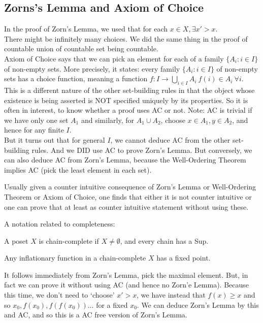 \subsection{Zorns's Lemma and Axiom of Choice}
In the proof of Zorn's Lemma, we used that for each $x \in X, \exists x' >x$.\\
There might be infinitely many choices. We did the same thing in
the proof of countable union of countable set being countable.\\
Axiom of Choice says that we can pick an element for each of a
family $\{A_i: i \in I\}$ of non-empty sets. More precisely,
it states: every family $\{A_i: i \in I\}$ of non-empty sets has a
choice function, meaning a function $f: I \rightarrow \bigcup_{i \in I}A_i~ f(i) \in A_i~\forall i$.\\
This is a different nature of the other set-building rules in that the
object whose existence is being asserted is NOT specified uniquely by
its properties. So it is often in interest, to know whether a proof uses AC or not.
Note: AC is trivial if we have only one set $A_1$ and similarly,
for $A_1 \cup A_2$, choose $x \in A_1, y \in A_2$, and hence for any
finite $I$.\\
But it turns out that for general $I$, we cannot deduce AC from the
other set-building rules. And we DID use AC to prove Zorn's Lemma.
But conversely, we can also deduce AC from Zorn's Lemma, because
the Well-Ordering Theorem implies AC (pick the least element in each set).
\begin{remark} Usually given a counter intuitive consequence of Zorn's Lemma
or Well-Ordering Theorem or Axiom of Choice, one finds that either
it is not counter intuitive or one can prove that at least as counter
intuitive statement without using these.
\end{remark}
A notation related to completeness:
\begin{definition} A poset $X$ is chain-complete if $X \neq \emptyset$, and
every chain has a Sup.
\end{definition}
\begin{theorem} Any inflationary function in a chain-complete $X$ has a
fixed point.
\end{theorem}
It follows immediately from Zorn's Lemma, pick the maximal element. But,
in fact we can prove it without using AC (and hence no Zorn'e Lemma).
Because this time, we don't need to `choose' $x' >x$, we have instead
that $f(x) \ge x$ and so $x_0,f(x_0),f(f(x_0)) \ldots$ for a fixed $x_0$.
We can deduce Zorn's Lemma by this and AC, and so this is a AC free
version of Zorn's Lemma.
